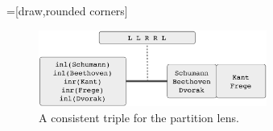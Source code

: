 =[draw,rounded corners]
\begin{figure}
    \begin{center}
        \includegraphics[width=75mm]{images/ex3-0.pdf}





    \end{center}
    \caption{A consistent triple for the partition lens.}
    \label{fig:triple-partition}
    \vspace*{-2ex}
\end{figure}

